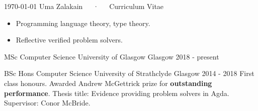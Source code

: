 \documentclass[11pt, a4paper]{awesome-cv}
\begin{document}
\makecvheader

\makecvfooter
  {\today}
  {Uma Zalakain~~~·~~~Curriculum Vitae}
  {\thepage}




\begin{itemize}
    \item {Programming language theory, type theory.}
    \item {Reflective verified problem solvers.}
\end{itemize}


\begin{cventries}
    \cventry
      {MSc Computer Science} %
      {University of Glasgow} %
      {Glasgow} %
      {2018 - present} %
      {}

    \cventry
      {BSc Hons Computer Science} %
      {University of Strathclyde} %
      {Glasgow} %
      {2014 - 2018} %
      {
          First class honours. Awarded Andrew McGettrick prize for
          \textbf{outstanding performance}.\newline
          Thesis title: Evidence providing problem solvers in Agda.\newline
          Supervisor: Conor McBride.\newline
      }
\end{cventries}

\end{document}
